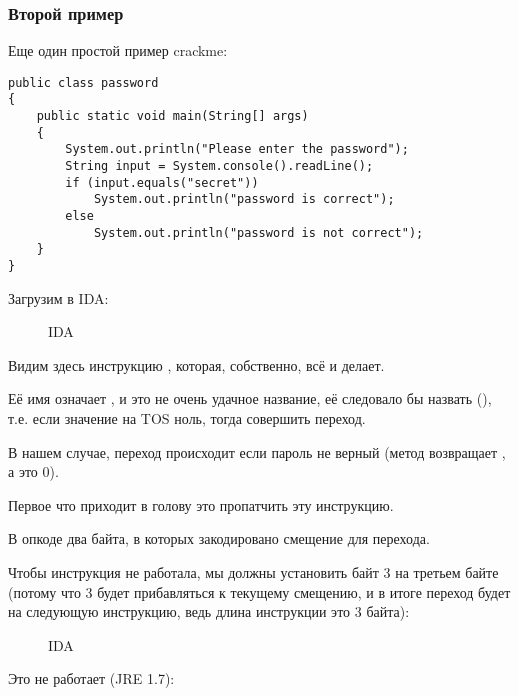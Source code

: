 \subsubsection{Второй пример}

Еще один простой пример crackme:

\begin{lstlisting}[style=customjava]
public class password
{
	public static void main(String[] args)
	{
		System.out.println("Please enter the password");
		String input = System.console().readLine();
		if (input.equals("secret"))
			System.out.println("password is correct");
		else
			System.out.println("password is not correct");
	}
}
\end{lstlisting}

Загрузим в IDA:

\begin{figure}[H]
\centering
{}
\caption{IDA}
\end{figure}


Видим здесь инструкцию , которая, собственно, всё и делает.

Её имя означает , и это не очень удачное название, её следовало бы назвать 
 (), т.е. если значение на \ac{TOS} ноль, тогда совершить переход.

В нашем случае, переход происходит если пароль не верный 
(метод  возвращает , а это 0).

Первое что приходит в голову это пропатчить эту инструкцию.

В опкоде  два байта, в которых закодировано смещение для перехода.

Чтобы инструкция не работала, мы должны установить байт 3 на третьем байте
(потому что 3 будет прибавляться к текущему смещению, и в итоге переход будет на следующую инструкцию,
ведь длина инструкции  это 3 байта):

\begin{figure}[H]
\centering
{}
\caption{IDA}
\end{figure}

Это не работает (JRE 1.7):

